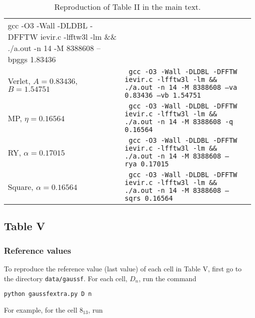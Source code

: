 \documentclass[preprint]{revtex4-1}
\numberwithin{equation}{subsection}
\numberwithin{table}{section}
\begin{document}
\begin{table}
\begin{tabular}{p{3cm} p{11cm} p{2cm}}
{    gcc -O3 -Wall -DLDBL -DFFTW ievir.c -lfftw3l -lm
    \newline
    \&\& ./a.out -n 14 -M 8388608 --bpggs 1.83436
  }
  &
  \\
  Verlet, \newline
  $A = 0.83436$, \newline
  $B = 1.54751$
  &
  \texttt{
    gcc -O3 -Wall -DLDBL -DFFTW ievir.c -lfftw3l -lm
    \newline
    \&\& ./a.out -n 14 -M 8388608 --va 0.83436 --vb 1.54751
  }
  &
  \\
  MP, \newline
  $\eta = 0.16564$
  &
  \texttt{
    gcc -O3 -Wall -DLDBL -DFFTW ievir.c -lfftw3l -lm
    \newline
    \&\& ./a.out -n 14 -M 8388608 -q 0.16564
  }
  &
  \\
  RY, \newline
  $\alpha = 0.17015$
  &
  \texttt{
    gcc -O3 -Wall -DLDBL -DFFTW ievir.c -lfftw3l -lm
    \newline
    \&\& ./a.out -n 14 -M 8388608 --rya 0.17015
  }
  &
  \\
  Square, \newline
  $\alpha = 0.16564$
  &
  \texttt{
    gcc -O3 -Wall -DLDBL -DFFTW ievir.c -lfftw3l -lm
    \newline
    \&\& ./a.out -n 14 -M 8388608 --sqrs 0.16564
  }
  &
  \\
  \hline
  \end{tabular}
  \caption{
    \label{tab:reprod_TableII}
    Reproduction of Table II in the main text.
  }
\end{table}



\subsection{Table V}



\subsubsection{Reference values}



To reproduce the reference value (last value) of
each cell in Table V,
first go to the directory
\texttt{data/gaussf}.
For each cell, $D_n$,
run the command

\qquad\texttt{python gaussfextra.py D n}

For example, for the cell $8_{13}$,
run
\end{document}
